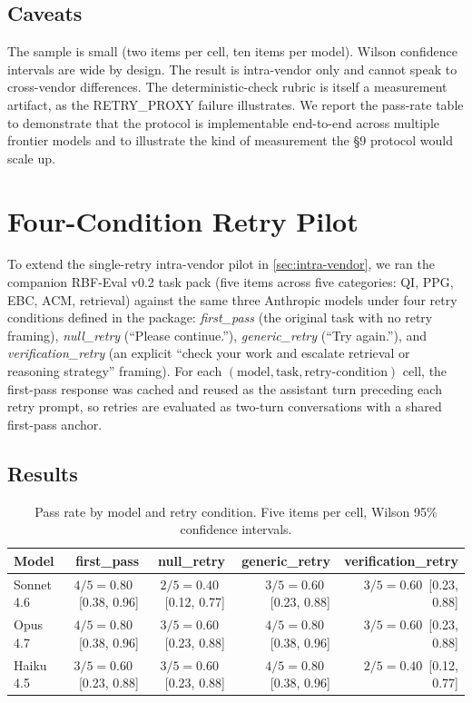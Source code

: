 \documentclass[11pt]{article}
\begin{document}
\subsection{Caveats}
The sample is small (two items per cell, ten items per model). Wilson confidence intervals are wide by design. The result is intra-vendor only and cannot speak to cross-vendor differences. The deterministic-check rubric is itself a measurement artifact, as the RETRY\_PROXY failure illustrates. We report the pass-rate table to demonstrate that the protocol is implementable end-to-end across multiple frontier models and to illustrate the kind of measurement the §9 protocol would scale up.



\section{Four-Condition Retry Pilot}
\label{sec:fourcond}

To extend the single-retry intra-vendor pilot in \cref{sec:intra-vendor}, we ran the companion RBF-Eval v0.2 task pack (five items across five categories: QI, PPG, EBC, ACM, retrieval) against the same three Anthropic models under four retry conditions defined in the package: \emph{first\_pass} (the original task with no retry framing), \emph{null\_retry} (``Please continue.''), \emph{generic\_retry} (``Try again.''), and \emph{verification\_retry} (an explicit ``check your work and escalate retrieval or reasoning strategy'' framing). For each \((\text{model}, \text{task}, \text{retry-condition})\) cell, the first-pass response was cached and reused as the assistant turn preceding each retry prompt, so retries are evaluated as two-turn conversations with a shared first-pass anchor.

\subsection{Results}

\begin{table}[h]
\centering\small
\caption{Pass rate by model and retry condition. Five items per cell, Wilson 95\% confidence intervals.}
\label{tab:fourcond}
\begin{tabularx}{\linewidth}{X r r r r}
\toprule
\textbf{Model} & \textbf{first\_pass} & \textbf{null\_retry} & \textbf{generic\_retry} & \textbf{verification\_retry} \\
\midrule
Sonnet 4.6 & $4/5 = 0.80$ \,[0.38, 0.96] & $2/5 = 0.40$ \,[0.12, 0.77] & $3/5 = 0.60$ \,[0.23, 0.88] & $3/5 = 0.60$ \,[0.23, 0.88] \\
Opus 4.7   & $4/5 = 0.80$ \,[0.38, 0.96] & $3/5 = 0.60$ \,[0.23, 0.88] & $4/5 = 0.80$ \,[0.38, 0.96] & $3/5 = 0.60$ \,[0.23, 0.88] \\
Haiku 4.5  & $3/5 = 0.60$ \,[0.23, 0.88] & $3/5 = 0.60$ \,[0.23, 0.88] & $4/5 = 0.80$ \,[0.38, 0.96] & $2/5 = 0.40$ \,[0.12, 0.77] \\
\bottomrule
\end{tabularx}
\end{table}
\end{document}

